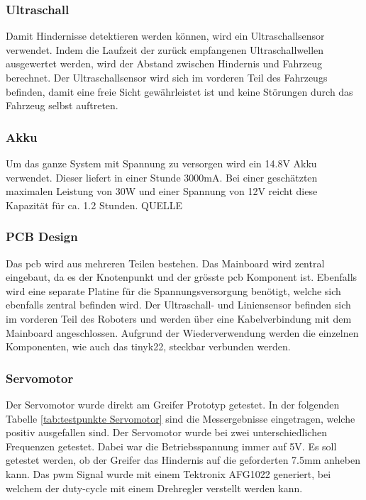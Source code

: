\subsubsection*{Ultraschall}


Damit Hindernisse detektieren werden können, wird ein Ultraschallsensor verwendet. Indem die Laufzeit der zurück empfangenen Ultraschallwellen ausgewertet werden, wird der Abstand zwischen Hindernis und Fahrzeug berechnet. Der Ultraschallsensor wird sich im vorderen Teil des Fahrzeugs befinden, damit eine freie Sicht gewährleistet ist und keine Störungen durch das Fahrzeug selbst auftreten.

\subsubsection*{Akku}


Um das ganze System mit Spannung zu versorgen wird ein 14.8V Akku verwendet. Dieser liefert in einer Stunde 3000mA. Bei einer geschätzten maximalen Leistung von 30W und einer Spannung von 12V reicht diese Kapazität für ca. 1.2 Stunden.  QUELLE

\subsubsection*{PCB Design}


Das \acrshort{pcb} wird aus mehreren Teilen bestehen. Das Mainboard wird zentral eingebaut, da es der Knotenpunkt und der grösste \acrshort{pcb} Komponent ist. Ebenfalls wird eine separate Platine für die Spannungsversorgung benötigt, welche sich ebenfalls zentral befinden wird. Der Ultraschall- und Liniensensor befinden sich im vorderen Teil des Roboters und werden über eine Kabelverbindung mit dem Mainboard angeschlossen. Aufgrund der Wiederverwendung werden die einzelnen Komponenten, wie auch das \gls{tinyk22}, steckbar verbunden werden.

\subsubsection*{Servomotor}


Der Servomotor wurde direkt am Greifer Prototyp getestet. In der folgenden Tabelle \ref{tab:testpunkte Servomotor} sind die Messergebnisse eingetragen, welche positiv ausgefallen sind. Der Servomotor wurde bei zwei unterschiedlichen Frequenzen getestet. Dabei war die Betriebsspannung immer auf 5V. Es soll getestet werden, ob der Greifer das Hindernis auf die geforderten 7.5mm anheben kann. Das \acrshort{pwm} Signal wurde mit einem Tektronix AFG1022 generiert, bei welchem der \gls{duty-cycle} mit einem Drehregler verstellt werden kann.

